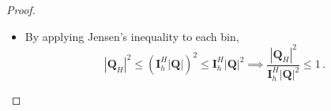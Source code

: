 \documentclass[10pt,a4paper]{amsart}
\begin{document}
\begin{proof}
\begin{itemize}
\begin{equation*}
\begin{aligned}
            &=\frac{(\bm{I}_h^H|\bm{Q}|)^2}{\bm{I}_h^H|\bm{Q}|^2}\leq 1\,,
        \end{aligned}
    \end{equation*}
    where the last element-wise inequality follows from Jensen's inequality applied to each bin. Hence, by exactly the same argument as the proof of the previous statement, we have
    \begin{equation*}
        \bm{I}_h^H\left|\frac{(\bm{I}_H^h\bm{Q}_H)\odot \bm{W}_{\bm{z}}}{\bm{Q}}\right|\leq 1 \implies \left|\frac{(\bm{I}_H^h\bm{Q}_H)\odot\bm{W}_{\bm{z}}}{\bm{Q}}\right|\leq 4\,,
    \end{equation*}
    where the inequalities are satisfied element-wise. We note the sharp bound for the last inequality is $3/2$, but its more involved derivation is omitted here.
    \item By applying Jensen's inequality to each bin, 
    \begin{equation*}
        |\bm{Q}_H|^2 \leq\left(\bm{I}_h^H|\bm{Q}|\right)^2\leq \bm{I}_h^H |\bm{Q}|^2\implies \frac{|\bm{Q}_H|^2}{\bm{I}_h^H|\bm{Q}|^2}
        \leq 1\,.
    \end{equation*}
\end{itemize}
\end{proof}
\end{document}
